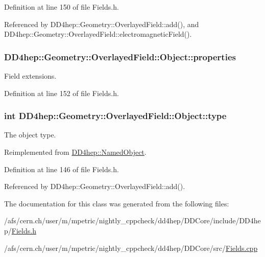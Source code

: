 Definition at line 150 of file Fields.h.

Referenced by DD4hep::Geometry::OverlayedField::add(), and DD4hep::Geometry::OverlayedField::electromagneticField().\hypertarget{class_d_d4hep_1_1_geometry_1_1_overlayed_field_1_1_object_a184fdde08ca58abba25c3fbe812e21bc}{
\subsubsection[{properties}]{ {\bf DD4hep::Geometry::OverlayedField::Object::properties}}}
\label{class_d_d4hep_1_1_geometry_1_1_overlayed_field_1_1_object_a184fdde08ca58abba25c3fbe812e21bc}


Field extensions. 

Definition at line 152 of file Fields.h.\hypertarget{class_d_d4hep_1_1_geometry_1_1_overlayed_field_1_1_object_a9cf611593f516274f139d0524d8480de}{
\subsubsection[{type}]{\setlength{\rightskip}{0pt plus 5cm}int {\bf DD4hep::Geometry::OverlayedField::Object::type}}}
\label{class_d_d4hep_1_1_geometry_1_1_overlayed_field_1_1_object_a9cf611593f516274f139d0524d8480de}


The object type. 

Reimplemented from \hyperlink{class_d_d4hep_1_1_named_object_a8e17bb5f854b320302be44c68c39a192}{DD4hep::NamedObject}.

Definition at line 146 of file Fields.h.

Referenced by DD4hep::Geometry::OverlayedField::add().

The documentation for this class was generated from the following files:\begin{DoxyCompactItemize}
\item 
/afs/cern.ch/user/m/mpetric/nightly\_\-cppcheck/dd4hep/DDCore/include/DD4hep/\hyperlink{_fields_8h}{Fields.h}\item 
/afs/cern.ch/user/m/mpetric/nightly\_\-cppcheck/dd4hep/DDCore/src/\hyperlink{_fields_8cpp}{Fields.cpp}\end{DoxyCompactItemize}
